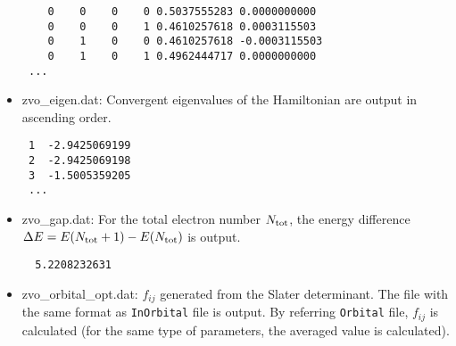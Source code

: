 \begin{itemize}
\begin{minipage}{13cm}
\begin{screen}
\begin{verbatim}
    0    0    0    0 0.5037555283 0.0000000000
    0    0    0    1 0.4610257618 0.0003115503
    0    1    0    0 0.4610257618 -0.0003115503
    0    1    0    1 0.4962444717 0.0000000000
 ...
\end{verbatim}
\end{screen}
\end{minipage}    
    
\item{zvo\_eigen.dat:} Convergent eigenvalues of the Hamiltonian are output in ascending order. \\
\begin{minipage}{13cm}
\begin{screen}
\begin{verbatim}
 1  -2.9425069199
 2  -2.9425069198
 3  -1.5005359205 
 ...
\end{verbatim}
\end{screen}
\end{minipage}

\item{zvo\_gap.dat:} For the total electron number $N_{\rm tot}$, the energy difference $\Delta E= E(N_{\rm tot}+1)-E(N_{\rm tot})$ is output.

\begin{minipage}{13cm}
\begin{screen}
\begin{verbatim}
  5.2208232631
\end{verbatim}
\end{screen}
\end{minipage}

\item{zvo\_orbital\_opt.dat:} $f_{ij}$ generated from the Slater determinant. The file with the same format as \verb|InOrbital| file is output.
By referring \verb|Orbital| file, $f_{ij}$ is calculated (for the same type of parameters, the averaged value is calculated).


\end{itemize}



